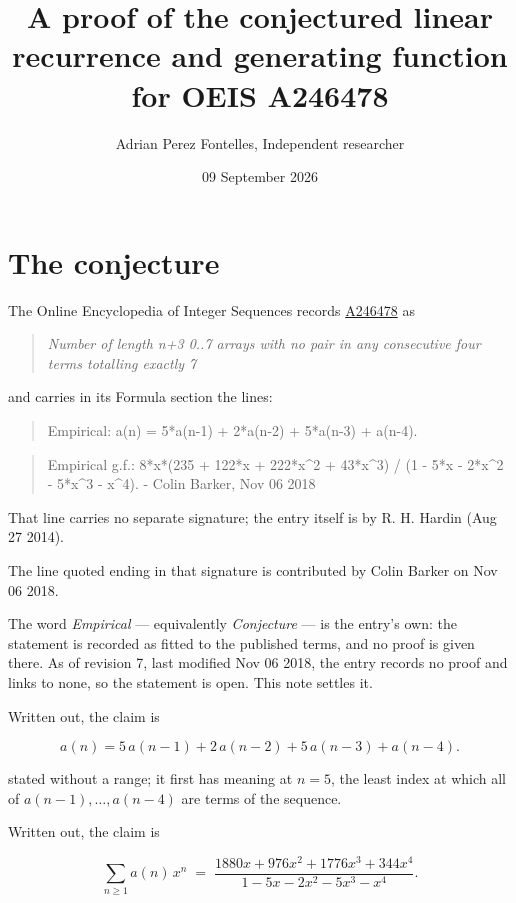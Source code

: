 \documentclass[11pt]{article}
\title{A proof of the conjectured linear recurrence and generating function for OEIS A246478}
\author{Adrian Perez Fontelles, Independent researcher}
\date{09 September 2026}
\theoremstyle{definition}
\begin{document}
\maketitle
\section{The conjecture}

The Online Encyclopedia of Integer Sequences records \href{https://oeis.org/A246478}{A246478} as

\begin{quote}\itshape Number of length n+3 0..7 arrays with no pair in any consecutive four terms totalling exactly 7\end{quote}

and carries in its Formula section the lines:

\begin{quote}\ttfamily Empirical: a(n) = 5*a(n-1) + 2*a(n-2) + 5*a(n-3) + a(n-4).\end{quote}

\begin{quote}\ttfamily Empirical g.f.: 8*x*(235 + 122*x + 222*x\textasciicircum{}2 + 43*x\textasciicircum{}3) / (1 - 5*x - 2*x\textasciicircum{}2 - 5*x\textasciicircum{}3 - x\textasciicircum{}4). - Colin Barker, Nov 06 2018\end{quote}

That line carries no separate signature; the entry itself is by R. H. Hardin (Aug 27 2014).

The line quoted ending in that signature is contributed by Colin Barker on Nov 06 2018.

The word {\itshape Empirical} --- equivalently {\itshape Conjecture} --- is the entry's own: the statement is recorded as fitted to the published terms, and no proof is given there. As of revision 7, last modified Nov 06 2018, the entry records no proof and links to none, so the statement is open. This note settles it.

Written out, the claim is

\[a(n) = 5\,a(n-1) + 2\,a(n-2) + 5\,a(n-3) + a(n-4).\]

stated without a range; it first has meaning at $n = 5$, the least index at which all of $a(n-1),\dots,a(n-4)$ are terms of the sequence.

Written out, the claim is

\[\sum_{n \ge 1} a(n)\,x^n \;=\; \frac{1880x + 976x^{2} + 1776x^{3} + 344x^{4}}{1 - 5x - 2x^{2} - 5x^{3} - x^{4}}.\]
\end{document}

